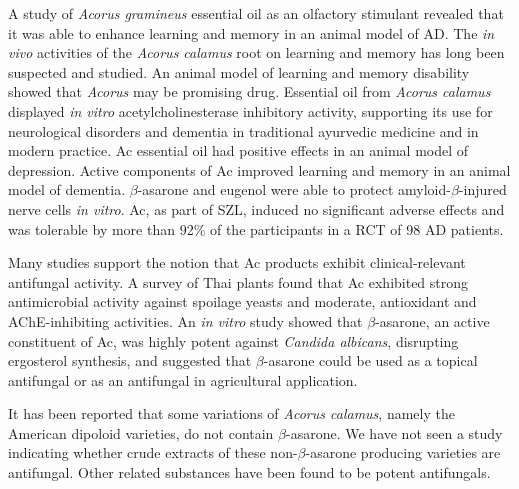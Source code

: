 A study of \textit{Acorus gramineus}
essential oil as an olfactory stimulant revealed that it was
able to enhance learning and memory in an animal model of AD.
\cite{liu2010study}
The \textit{in vivo} activities of the
\textit{Acorus calamus} root on learning and memory
has long been suspected and studied.
An animal model of learning and memory disability
showed that \textit{Acorus} may be promising drug.
\cite{wenling1993facilitatory}
Essential oil from \textit{Acorus calamus}
displayed \textit{in vitro}
acetylcholinesterase inhibitory activity,
supporting its use for neurological disorders
and dementia in traditional ayurvedic medicine
and in modern practice.
\cite{mukherjee2007vitro}
Ac essential oil had positive effects
in an animal model of depression.
\cite{han2013antidepressant}
Active components of Ac improved learning and memory in
an animal model of dementia.
\cite{guo2012effects}
$\beta$-asarone and eugenol were able to
protect amyloid-$\beta$-injured nerve cells \textit{in vitro}.
\cite{jiang2006protective}
Ac, as part of SZL,
induced no significant adverse effects
and was tolerable by more than 92\% of the participants
in a RCT of 98 AD patients.
\cite{pan2014shen}

Many studies support the notion that Ac products exhibit clinical-relevant
antifungal activity.
A survey of Thai plants found that Ac
exhibited strong antimicrobial activity against spoilage yeasts
and moderate, antioxidant and AChE-inhibiting activities.
\cite{nanasombat2014antimicrobial}
An \textit{in vitro} study showed that $\beta$-asarone,
an active constituent of Ac,
was highly potent against \textit{Candida albicans},
disrupting ergosterol synthesis,
and suggested that $\beta$-asarone could be used as a topical
antifungal
\cite{rajput2013beta}
or as an antifungal in agricultural application.
\cite{lee2004antifungal}

It has been reported that some variations of \textit{Acorus calamus},
namely the American dipoloid varieties,
do not contain $\beta$-asarone.
\cite{phongpaichit2005antimicrobial}
We have not seen a study indicating whether crude extracts
of these non-$\beta$-asarone producing varieties are antifungal.
Other related substances have been found to be potent antifungals.
\cite{rajput2013anti}

